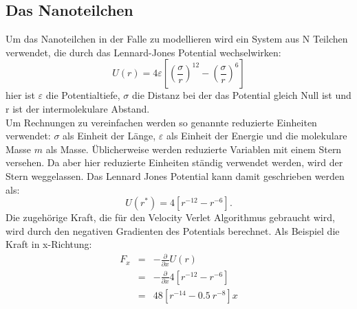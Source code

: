 \documentclass[12pt]{article}
\begin{document}
\subsection{Das Nanoteilchen}
Um das Nanoteilchen in der Falle zu modellieren wird ein System aus N Teilchen verwendet, die durch das Lennard-Jones Potential 
wechselwirken:
\begin{equation}
    \label{eq:lj}
    U(r) = 4\varepsilon\left[\left(\frac\sigma r\right)^{12} - \left(\frac\sigma r\right)^6\right]
\end{equation}
hier ist $\varepsilon$ die Potentialtiefe, $\sigma$ die Distanz bei der das Potential gleich Null ist und r ist der intermolekulare Abstand.\\
Um Rechnungen zu vereinfachen werden so genannte reduzierte Einheiten verwendet: $\sigma$ als Einheit der Länge, $\varepsilon$ als Einheit 
der Energie und die molekulare Masse $m$ als Masse. Üblicherweise werden reduzierte Variablen mit einem Stern versehen. Da aber hier reduzierte 
Einheiten ständig verwendet werden, wird der Stern weggelassen.
Das Lennard Jones Potential kann damit geschrieben werden als:
\begin{equation}
    U(r^*) = 4\left[{r}^{-12} - {r}^{-6}\right].
\end{equation}
Die zugehörige Kraft, die für den Velocity Verlet Algorithmus gebraucht wird, wird durch den negativen Gradienten des
Potentials berechnet. Als Beispiel die Kraft in x-Richtung:
\begin{eqnarray}
    F_{x} &=& -\frac{\partial}{\partial x} U(r) \nonumber\\
                &=& -\frac{\partial}{\partial x} 4\left[{r}^{-12} - {r}^{-6}\right] \nonumber\\
    \label{eq:ljforce} &=& 48 \left[r^{-14} - 0.5 \ r^{-8}\right] x
\end{eqnarray}
\end{document}

